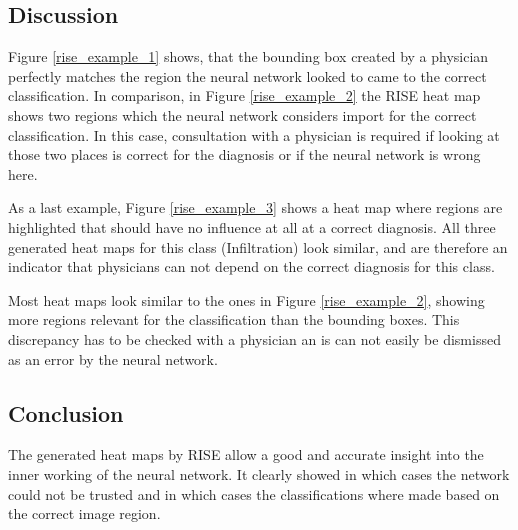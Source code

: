 \subsection{Discussion}
Figure \ref{rise_example_1} shows, that the bounding box created by a physician perfectly matches the region the neural network looked to came to the correct classification. In comparison, in Figure \ref{rise_example_2} the RISE heat map shows two regions which the neural network considers import for the correct classification. In this case, consultation with a physician is required if looking at those two places is correct for the diagnosis or if the neural network is wrong here.

As a last example, Figure \ref{rise_example_3} shows a heat map where regions are highlighted that should have no influence at all at a correct diagnosis. All three generated heat maps for this class (Infiltration) look similar, and are therefore an indicator that physicians can not depend on the correct diagnosis for this class.

Most heat maps look similar to the ones in Figure \ref{rise_example_2}, showing more regions relevant for the classification than the bounding boxes. This discrepancy has to be checked with a physician an is can not easily be dismissed as an error by the neural network.

\subsection{Conclusion}
The generated heat maps by RISE allow a good and accurate insight into the inner working of the neural network. It clearly showed in which cases the network could not be trusted and in which cases the classifications where made based on the correct image region.
